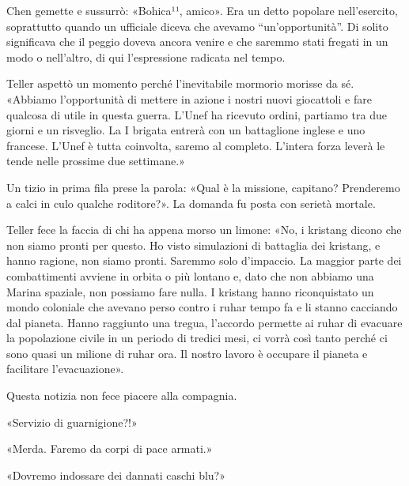 Chen gemette e sussurrò: «Bohica¹¹, amico». Era un detto popolare
nell'esercito, soprattutto quando un ufficiale diceva che avevamo
``un'opportunità''. Di solito significava che il peggio doveva ancora
venire e che saremmo stati fregati in un modo o nell'altro, di qui
l'espressione radicata nel tempo.

Teller aspettò un momento perché l'inevitabile mormorio morisse da sé.
«Abbiamo l'opportunità di mettere in azione i nostri nuovi giocattoli e
fare qualcosa di utile in questa guerra. L'Unef ha ricevuto ordini,
partiamo tra due giorni e un risveglio. La I brigata entrerà con un
battaglione inglese e uno francese. L'Unef è tutta coinvolta, saremo al
completo. L'intera forza leverà le tende nelle prossime due settimane.»

Un tizio in prima fila prese la parola: «Qual è la missione, capitano?
Prenderemo a calci in culo qualche roditore?». La domanda fu posta con
serietà mortale.

Teller fece la faccia di chi ha appena morso un limone: «No, i kristang
dicono che non siamo pronti per questo. Ho visto simulazioni di
battaglia dei kristang, e hanno ragione, non siamo pronti. Saremmo solo
d'impaccio. La maggior parte dei combattimenti avviene in orbita o più
lontano e, dato che non abbiamo una Marina spaziale, non possiamo fare
nulla. I kristang hanno riconquistato un mondo coloniale che avevano
perso contro i ruhar tempo fa e li stanno cacciando dal pianeta. Hanno
raggiunto una tregua, l'accordo permette ai ruhar di evacuare la
popolazione civile in un periodo di tredici mesi, ci vorrà così tanto
perché ci sono quasi un milione di ruhar ora. Il nostro lavoro è
occupare il pianeta e facilitare l'evacuazione».

Questa notizia non fece piacere alla compagnia.

«Servizio di guarnigione?!»

«Merda. Faremo da corpi di pace armati.»

«Dovremo indossare dei dannati caschi blu?»

